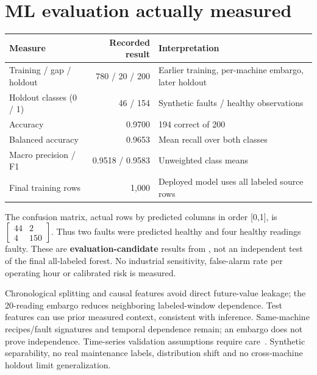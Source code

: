 \section{ML evaluation actually measured}
\par\smallskip\noindent\begin{tabularx}{\linewidth}{@{}l r X@{}}\toprule
Measure & Recorded result & Interpretation\\\midrule
Training / gap / holdout & 780 / 20 / 200 & Earlier training, per-machine embargo, later holdout\\
Holdout classes (0 / 1) & 46 / 154 & Synthetic faults / healthy observations\\
Accuracy & 0.9700 & 194 correct of 200\\
Balanced accuracy & 0.9653 & Mean recall over both classes\\
Macro precision / F1 & 0.9518 / 0.9583 & Unweighted class means\\
Final training rows & 1,000 & Deployed model uses all labeled source rows\\\bottomrule
\end{tabularx}\par\smallskip
The confusion matrix, actual rows by predicted columns in order [0,1], is \(\left[\begin{smallmatrix}44&2\\4&150\end{smallmatrix}\right]\). Thus two faults were predicted healthy and four healthy readings faulty. These are \textbf{evaluation-candidate} results from , not an independent test of the final all-labeled forest. No industrial sensitivity, false-alarm rate per operating hour or calibrated risk is measured.

Chronological splitting and causal features avoid direct future-value leakage; the 20-reading embargo reduces neighboring labeled-window dependence. Test features can use prior measured context, consistent with inference. Same-machine recipes/fault signatures and temporal dependence remain; an embargo does not prove independence. Time-series validation assumptions require care~\cite{bergmeir}. Synthetic separability, no real maintenance labels, distribution shift and no cross-machine holdout limit generalization.
